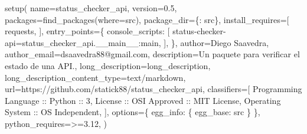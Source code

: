 \documentclass[
  a4paper,
  DIV=11,
  numbers=noendperiod,
  onepage,
  openany]{scrreprt}
\newenvironment{Shaded}{\begin{snugshade}}{\end{snugshade}}
\newcommand{\NormalTok}[1]{\textcolor[rgb]{0.00,0.23,0.31}{#1}}
\newcommand{\OperatorTok}[1]{\textcolor[rgb]{0.37,0.37,0.37}{#1}}
\newcommand{\StringTok}[1]{\textcolor[rgb]{0.13,0.47,0.30}{#1}}
\begin{document}
\begin{tcolorbox}
\begin{Shaded}
\begin{Highlighting}[]
\NormalTok{setup(}
\NormalTok{    name}\OperatorTok{=}\StringTok{\textquotesingle{}status\_checker\_api\textquotesingle{}}\NormalTok{,}
\NormalTok{    version}\OperatorTok{=}\StringTok{\textquotesingle{}0.5\textquotesingle{}}\NormalTok{,}
\NormalTok{    packages}\OperatorTok{=}\NormalTok{find\_packages(where}\OperatorTok{=}\StringTok{\textquotesingle{}src\textquotesingle{}}\NormalTok{),}
\NormalTok{    package\_dir}\OperatorTok{=}\NormalTok{\{}\StringTok{\textquotesingle{}\textquotesingle{}}\NormalTok{: }\StringTok{\textquotesingle{}src\textquotesingle{}}\NormalTok{\},}
\NormalTok{    install\_requires}\OperatorTok{=}\NormalTok{[}
        \StringTok{\textquotesingle{}requests\textquotesingle{}}\NormalTok{,}
\NormalTok{    ],}
\NormalTok{    entry\_points}\OperatorTok{=}\NormalTok{\{}
        \StringTok{\textquotesingle{}console\_scripts\textquotesingle{}}\NormalTok{: [}
            \StringTok{\textquotesingle{}status{-}checker{-}api=status\_checker\_api.\_\_main\_\_:main\textquotesingle{}}\NormalTok{,}
\NormalTok{        ],}
\NormalTok{    \},}
\NormalTok{    author}\OperatorTok{=}\StringTok{\textquotesingle{}Diego Saavedra\textquotesingle{}}\NormalTok{,}
\NormalTok{    author\_email}\OperatorTok{=}\StringTok{\textquotesingle{}dsaavedra88@gmail.com\textquotesingle{}}\NormalTok{,}
\NormalTok{    description}\OperatorTok{=}\StringTok{\textquotesingle{}Un paquete para verificar el estado de una API.\textquotesingle{}}\NormalTok{,}
\NormalTok{    long\_description}\OperatorTok{=}\NormalTok{long\_description,}
\NormalTok{    long\_description\_content\_type}\OperatorTok{=}\StringTok{\textquotesingle{}text/markdown\textquotesingle{}}\NormalTok{,}
\NormalTok{    url}\OperatorTok{=}\StringTok{\textquotesingle{}https://github.com/statick88/status\_checker\_api\textquotesingle{}}\NormalTok{,}
\NormalTok{    classifiers}\OperatorTok{=}\NormalTok{[}
        \StringTok{\textquotesingle{}Programming Language :: Python :: 3\textquotesingle{}}\NormalTok{,}
        \StringTok{\textquotesingle{}License :: OSI Approved :: MIT License\textquotesingle{}}\NormalTok{,}
        \StringTok{\textquotesingle{}Operating System :: OS Independent\textquotesingle{}}\NormalTok{,}
\NormalTok{    ],}
\NormalTok{    options}\OperatorTok{=}\NormalTok{\{}
        \StringTok{\textquotesingle{}egg\_info\textquotesingle{}}\NormalTok{: \{}
            \StringTok{\textquotesingle{}egg\_base\textquotesingle{}}\NormalTok{: }\StringTok{\textquotesingle{}src\textquotesingle{}}
\NormalTok{        \}}
\NormalTok{    \},}
\NormalTok{    python\_requires}\OperatorTok{=}\StringTok{\textquotesingle{}\textgreater{}=3.12\textquotesingle{}}\NormalTok{,}
\NormalTok{)}
\end{Highlighting}
\end{Shaded}


\end{tcolorbox}
\end{document}
